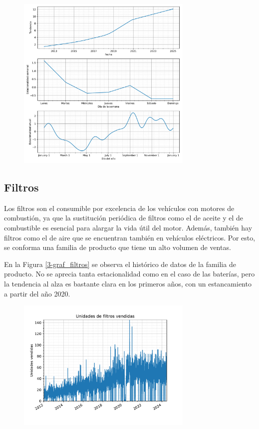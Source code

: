 \begin{figure}[H]
	{\includegraphics[width=0.75\textwidth]{imagenes/comps_baterias.pdf}}
\end{figure}


\subsection{Filtros}

Los filtros son el consumible por excelencia de los vehículos con motores de combustión, ya que la sustitución periódica de filtros como el de aceite y el de combustible es esencial para alargar la vida útil del motor. Además, también hay filtros como el de aire que se encuentran también en vehículos eléctricos. Por esto, se conforma una familia de producto que tiene un alto volumen de ventas.

En la Figura \ref{3-graf_filtros} se observa el histórico de datos de la familia de producto. No se aprecia tanta estacionalidad como en el caso de las baterías, pero la tendencia al alza es bastante clara en los primeros años, con un estancamiento a partir del año 2020.

\begin{figure}[H]
	{\includegraphics[width=0.75\textwidth]{imagenes/grafica_filtros.pdf}}
\end{figure}

